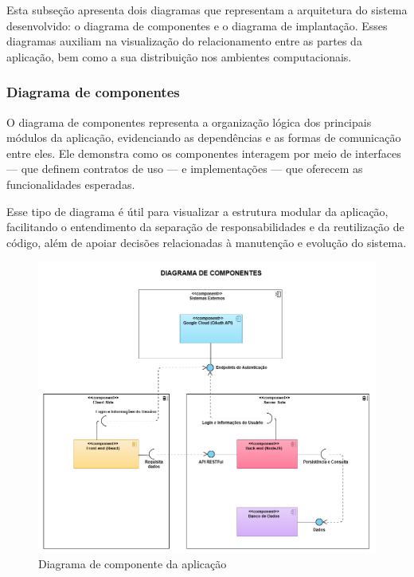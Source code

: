 Esta subseção apresenta dois diagramas que representam a arquitetura do sistema desenvolvido: o diagrama de componentes e o diagrama de implantação. Esses diagramas auxiliam na visualização do relacionamento entre as partes da aplicação, bem como a sua distribuição nos ambientes computacionais.

\subsubsection{Diagrama de componentes}


O diagrama de componentes representa a organização lógica dos principais módulos da aplicação, evidenciando as dependências e as formas de comunicação entre eles. Ele demonstra como os componentes interagem por meio de interfaces — que definem contratos de uso — e implementações — que oferecem as funcionalidades esperadas.

Esse tipo de diagrama é útil para visualizar a estrutura modular da aplicação, facilitando o entendimento da separação de responsabilidades e da reutilização de código, além de apoiar decisões relacionadas à manutenção e evolução do sistema.

\begin{figure}[htb]
  \centering
  \includegraphics[width=\textwidth]{cap04-desenvolvimento/images/4-3-2-1-diagrama-componentes}
  \caption{Diagrama de componente da aplicação}
  \label{fig:diagrama-componente}
\end{figure}

